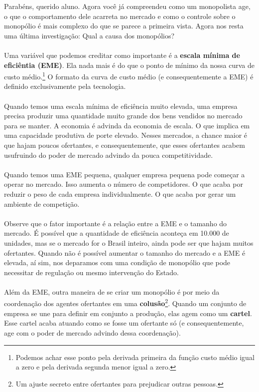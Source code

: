 \documentclass[a4paper,11pt,oneside]{book}
\theoremstyle{definition}
\theoremstyle{break}
\begin{document}
Parabéns, querido aluno. Agora você já compreendeu como um monopolista age, o que o comportamento dele acarreta no mercado e como o controle sobre o monopólio é mais complexo do que se parece a primeira vista. Agora nos resta uma última investigação: Qual a causa dos monopólios?
\\~\\
Uma variável que podemos creditar como importante é a \textbf{escala mínima de eficiêntia (EME)}. Ela nada mais é do que o ponto de mínimo da nossa curva de custo médio.\footnote{Podemos achar esse ponto pela derivada primeira da função custo médio igual a zero e pela derivada segunda menor igual a zero.} O formato da curva de custo médio (e consequentemente a EME) é definido exclusivamente pela tecnologia.
\\~\\
Quando temos uma escala mínima de eficiência muito elevada, uma empresa precisa produzir uma quantidade muito grande dos bens vendidos no mercado para se manter. A economia é advinda da economia de escala. O que implica em uma capacidade produtiva de porte elevado. Nesses mercados, a chance maior é que hajam poucos ofertantes, e consequentemente, que esses ofertantes acabem usufruindo do poder de mercado advindo da pouca competitividade.
\\~\\
Quando temos uma EME pequena, qualquer empresa pequena pode começar a operar no mercado. Isso aumenta o número de competidores. O que acaba por reduzir o peso de cada empresa individualmente. O que acaba por gerar um ambiente de competição.
\\~\\
Observe que o fator importante é a relação entre a EME e o tamanho do mercado. É possível que a quantidade de eficiência aconteça em 10.000 de unidades, mas se o mercado for o Brasil inteiro, ainda pode ser que hajam muitos ofertantes. Quando não é possível aumentar o tamanho do mercado e a EME é elevada, aí sim, nos deparamos com uma condição de monopólio que pode necessitar de regulação ou mesmo intervenção do Estado.
\\~\\
Além da EME, outra maneira de se criar um monopólio é por meio da coordenação dos agentes ofertantes em uma \textbf{colusão}\footnote{Um ajuste secreto entre ofertantes para prejudicar outras pessoas.}. Quando um conjunto de empresa se une para definir em conjunto a produção, elas agem como um \textbf{cartel}. Esse cartel acaba atuando como se fosse um ofertante só (e consequentemente, age com o poder de mercado advindo dessa coordenação).
\end{document}
